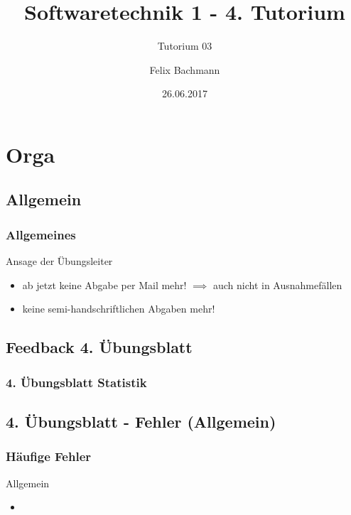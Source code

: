 \documentclass[18pt]{beamer}
\title[SWT1]{Softwaretechnik 1 - 4. Tutorium}
\subtitle{Tutorium 03}
\author{Felix Bachmann}
\date{26.06.2017}
\institute{KIT - Institut für Programmstrukturen und Datenorganisation (IPD)}
\begin{document}

\begin{frame}
\titlepage
\end{frame}

\begin{frame}
\tableofcontents
\end{frame}


\section{Orga}


	\subsection{Allgemein}
	\begin{frame}
		\frametitle{Allgemeines}
		\begin{alertblock}{Ansage der Übungsleiter}
			\begin{itemize}
				\item ab jetzt keine Abgabe per Mail mehr!
				\linebreak $\implies$ auch nicht in Ausnahmefällen \pause
				\item keine semi-handschriftlichen Abgaben mehr!
			\end{itemize}
		\end{alertblock}
	\end{frame}

	\subsection{Feedback 4. Übungsblatt}
	\begin{frame}
		\frametitle{4. Übungsblatt Statistik}
	\end{frame}
	
	\subsection{4. Übungsblatt - Fehler (Allgemein)}
	\begin{frame}
		\frametitle{Häufige Fehler}
		\begin{block}{Allgemein}
			\begin{itemize}
				\item %
			\end{itemize}
		\end{block}
	\end{frame}
	
\end{document}
